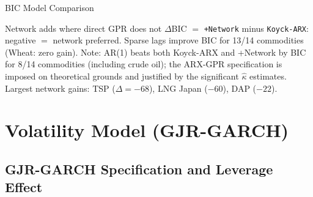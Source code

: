 ﻿\documentclass[aspectratio=1610]{beamer}
\begin{document}
\begin{frame}[shrink=30]{BIC Model Comparison}
  \medskip

  \begin{alertblock}{Network adds where direct GPR does not}
    $\Delta$BIC $=$ \texttt{+Network} minus \texttt{Koyck-ARX}: negative $=$ network preferred.
    Sparse lags improve BIC for 13/14 commodities (Wheat: zero gain).
    Note: AR(1) beats both Koyck-ARX and +Network by BIC for 8/14 commodities
    (including crude oil); the ARX-GPR specification is imposed on theoretical grounds
    and justified by the significant $\hat{\kappa}$ estimates.
    Largest network gains: TSP ($\Delta=-68$), LNG Japan ($-60$), DAP ($-22$).
  \end{alertblock}

\end{frame}

\section{Volatility Model (GJR-GARCH)}

\subsection{GJR-GARCH Specification and Leverage Effect}
\end{document}
